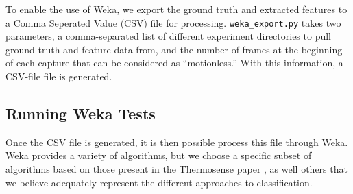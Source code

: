 \documentclass[../thesis/thesis.tex]{subfiles}
\begin{document}
To enable the use of Weka, we export the ground truth and extracted features to a Comma Seperated Value (CSV) file for processing. \texttt{weka\_export.py} takes two parameters, a comma-separated list of different experiment directories to pull ground truth and feature data from, and the number of frames at the beginning of each capture that can be considered as ``motionless.'' With this information, a CSV-file file is generated.

\subsection{Running Weka Tests}
Once the CSV file is generated, it is then possible process this file through Weka. Weka provides a variety of algorithms, but we choose a specific subset of algorithms based on those present in the Thermosense paper \cite{beltran2013thermosense}, as well others that we believe adequately represent the different approaches to classification.
\end{document}
